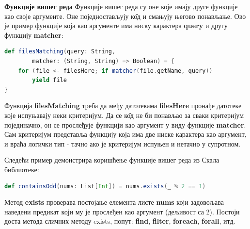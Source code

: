 \documentclass[12pt,oneside]{memoir}
\begin{document}
\begin{description}
	\item \textbf{Функције вишег реда} %
Функције вишег реда су оне које имају друге функције као своје аргументе. Оне поједностављују к\^{о}д и смањују његово понављање. Ово је пример функције која као аргументе има ниску карактера \textbf{query} и другу функцију \textbf{matcher}:
\begin{lstlisting}[language=Scala]
def filesMatching(query: String, 
		matcher: (String, String) => Boolean) = {
	for (file <- filesHere; if matcher(file.getName, query))
		yield file
}
\end{lstlisting}
Функција \textbf{filesMatching} треба да међу датотекама \textbf{filesHere} пронађе датотеке које испуњавају неки критеријум. Да се к\^{о}д не би понављао за сваки критеријум појединачно, он се прослеђује функцији као аргумент у виду функције \textbf{matcher}. Сам критеријум представља функцију која има две ниске карактера као аргумент, и враћа логички тип - тачно ако је критеријум испуњен и нетачно у супротном.
\par Следећи пример демонстрира коришћење функције вишег реда из Скала библиотеке:
\begin{lstlisting}[language=Scala]
def containsOdd(nums: List[Int]) = nums.exists(_ % 2 == 1)
\end{lstlisting}
Метод \textbf{exists} проверава постојање елемента листе \textbf{nums} који задовољава наведени предикат који му је прослеђен као аргумент (дељивост са 2).  Постоји доста метода сличних методу exists, попут: \textbf{find}, \textbf{filter}, \textbf{foreach}, \textbf{forall}, итд.


\end{description}
\end{document}
